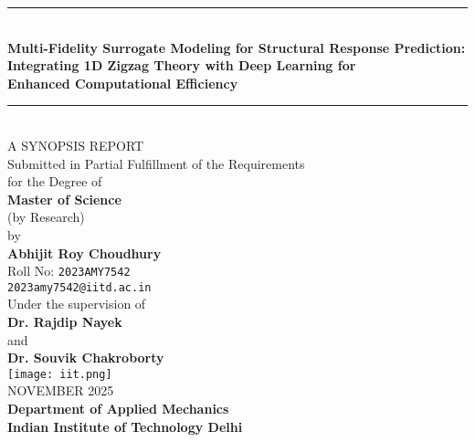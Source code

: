 \documentclass[12pt,a4paper]{report}
\begin{document}
\begin{titlepage}
\centering
\vspace*{-1.5cm}

\rule{\textwidth}{0.6pt} \\[0.4cm]

{\LARGE \textbf{Multi-Fidelity Surrogate Modeling for Structural Response Prediction:}}\\[0.3cm]
{\Large \textbf{Integrating 1D Zigzag Theory with Deep Learning for}}\\[0.1cm]
{\Large \textbf{Enhanced Computational Efficiency}} \\[0.4cm]

\rule{\textwidth}{0.6pt} \\[0.05cm]

{\large \textsc{A SYNOPSIS REPORT}}\\[0.4cm]
{\normalsize Submitted in Partial Fulfillment of the Requirements\\
for the Degree of}\\[0.3cm]

{\large \textbf{Master of Science}}\\
{\large (by Research)}\\[0.1cm]

\large by\\[0.3cm]
{\Large \textbf{Abhijit Roy Choudhury}}\\[0.1cm]
{\normalsize Roll No: \texttt{2023AMY7542}}\\
\texttt{2023amy7542@iitd.ac.in} \\[0.5cm]

{\normalsize Under the supervision of}\\[0.3cm]
{\large \textbf{Dr. Rajdip Nayek}}\\
{\large and}\\
{\large \textbf{Dr. Souvik Chakroborty}}\\[0.7cm]

\texttt{[image: iit.png]} \\[0.7cm]

{\large NOVEMBER 2025} \\[0.3cm]
{\large \textbf{Department of Applied Mechanics}}\\
{\large \textbf{Indian Institute of Technology Delhi}}

\end{titlepage}
\end{document}
